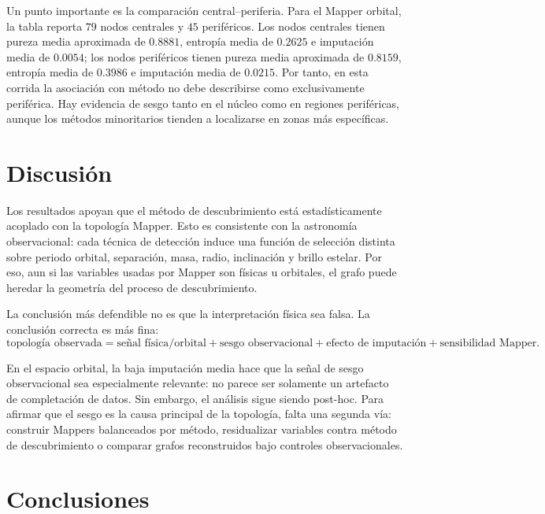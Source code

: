 \documentclass[11pt]{article}
\begin{document}
Un punto importante es la comparación central--periferia. Para el Mapper orbital, la tabla reporta $79$ nodos centrales y $45$ periféricos. Los nodos centrales tienen pureza media aproximada de $0.8881$, entropía media de $0.2625$ e imputación media de $0.0054$; los nodos periféricos tienen pureza media aproximada de $0.8159$, entropía media de $0.3986$ e imputación media de $0.0215$. Por tanto, en esta corrida la asociación con método no debe describirse como exclusivamente periférica. Hay evidencia de sesgo tanto en el núcleo como en regiones periféricas, aunque los métodos minoritarios tienden a localizarse en zonas más específicas.

\section{Discusión}

Los resultados apoyan que el método de descubrimiento está estadísticamente acoplado con la topología Mapper. Esto es consistente con la astronomía observacional: cada técnica de detección induce una función de selección distinta sobre periodo orbital, separación, masa, radio, inclinación y brillo estelar. Por eso, aun si las variables usadas por Mapper son físicas u orbitales, el grafo puede heredar la geometría del proceso de descubrimiento.

La conclusión más defendible no es que la interpretación física sea falsa. La conclusión correcta es más fina:
\[
\text{topología observada} = \text{señal física/orbital} + \text{sesgo observacional} + \text{efecto de imputación} + \text{sensibilidad Mapper}.
\]

En el espacio orbital, la baja imputación media hace que la señal de sesgo observacional sea especialmente relevante: no parece ser solamente un artefacto de completación de datos. Sin embargo, el análisis sigue siendo post-hoc. Para afirmar que el sesgo es la causa principal de la topología, falta una segunda vía: construir Mappers balanceados por método, residualizar variables contra método de descubrimiento o comparar grafos reconstruidos bajo controles observacionales.

\section{Conclusiones}
\end{document}
